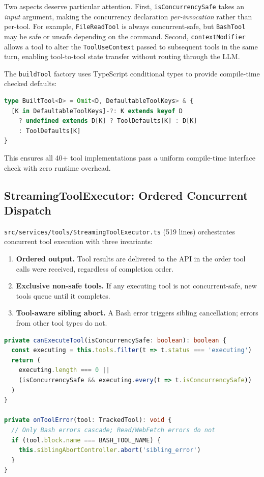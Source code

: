 \documentclass{article}
\newcommand{\file}[1]{\texttt{\small #1}}
\newcommand{\code}[1]{\texttt{#1}}
\begin{document}
Two aspects deserve particular attention. First, \code{isConcurrencySafe} takes an \emph{input} argument, making the concurrency declaration \emph{per-invocation} rather than per-tool. For example, \code{FileReadTool} is always concurrent-safe, but \code{BashTool} may be safe or unsafe depending on the command. Second, \code{contextModifier} allows a tool to alter the \code{ToolUseContext} passed to subsequent tools in the same turn, enabling tool-to-tool state transfer without routing through the LLM.

The \code{buildTool} factory uses TypeScript conditional types to provide compile-time checked defaults:
\begin{lstlisting}[language=TypeScript, caption={Conditional-type default injection in \texttt{buildTool}.}]
type BuiltTool<D> = Omit<D, DefaultableToolKeys> & {
  [K in DefaultableToolKeys]-?: K extends keyof D
    ? undefined extends D[K] ? ToolDefaults[K] : D[K]
    : ToolDefaults[K]
}
\end{lstlisting}
This ensures all 40+ tool implementations pass a uniform compile-time interface check with zero runtime overhead.

\subsection{StreamingToolExecutor: Ordered Concurrent Dispatch}

\file{src/services/tools/StreamingToolExecutor.ts} (519 lines) orchestrates concurrent tool execution with three invariants:

\begin{enumerate}
  \item \textbf{Ordered output.} Tool results are delivered to the API in the order tool calls were received, regardless of completion order.
  \item \textbf{Exclusive non-safe tools.} If any executing tool is not concurrent-safe, new tools queue until it completes.
  \item \textbf{Tool-aware sibling abort.} A Bash error triggers sibling cancellation; errors from other tool types do not.
\end{enumerate}

\begin{lstlisting}[language=TypeScript, caption={Concurrency predicate in \texttt{StreamingToolExecutor}.}]
private canExecuteTool(isConcurrencySafe: boolean): boolean {
  const executing = this.tools.filter(t => t.status === 'executing')
  return (
    executing.length === 0 ||
    (isConcurrencySafe && executing.every(t => t.isConcurrencySafe))
  )
}

private onToolError(tool: TrackedTool): void {
  // Only Bash errors cascade; Read/WebFetch errors do not
  if (tool.block.name === BASH_TOOL_NAME) {
    this.siblingAbortController.abort('sibling_error')
  }
}
\end{lstlisting}
\end{document}
